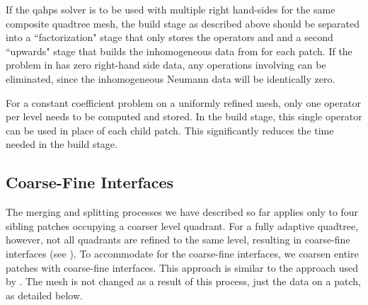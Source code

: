 \begin{remark}
    If the \gls{qahps} solver is to be used with multiple right hand-sides for the same composite quadtree mesh, the build stage as described above should be separated into a ``factorization" stage that only stores the operators \Ttau and \Stau and a second ``upwards" stage that builds the inhomogeneous data \wtau from \htau for each patch. If the problem in  has zero right-hand side data, any operations involving \htau can be eliminated, since the inhomogeneous Neumann data will be identically zero.
\end{remark}

\begin{remark}
    For a constant coefficient problem on a uniformly refined mesh, only one operator \Ttau per level needs to be computed and stored. In the build stage, this single operator can be used in place of each child patch. This significantly reduces the time needed in the build stage.
    \label{thm:operator-caching}
\end{remark}

\subsection{Coarse-Fine Interfaces}
\label{sub:mesh_adaptivity}

The merging and splitting processes we have described so far applies only to four sibling patches occupying a coarser level quadrant. For a fully adaptive quadtree, however, not all quadrants are refined to the same level, resulting in coarse-fine interfaces (see ). To accommodate for the coarse-fine interfaces, we coarsen entire patches with coarse-fine interfaces. This approach is similar to the approach used by \cite{babb2018accelerated}. The mesh is not changed as a result of this process, just the data on a patch, as detailed below.


